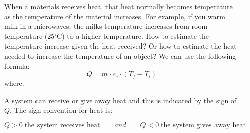 \documentclass[main.tex]{subfiles}
\begin{document}
\begin{description}
\item[] 
When a materials receives heat, that heat normally becomes temperature as the temperature of the material increases. For example, if you warm milk in a microwaves, the milk\textquotesingle s temperature increases from room temperature (25$^{\circ}$C) to a higher temperature. How to estimate the temperature increase given the heat received? Or how to estimate the heat needed to increase the temperature of an object? We can use the following formula:
\begin{equation}
\boxed{    Q=m\cdot c_e\cdot  (T_{f}-T_{i})   } 
\label{formula2:3}
\end{equation}
where:
A system can receive or give away heat and this is indicated by the sign of $Q$. The sign convention for heat is:
\begin{solutionbox}
\[ Q > 0 \; \text{the system receives heat}\qquad and \qquad Q < 0 \; \text{the system gives away heat}\]
\end{solutionbox}





\end{description}
\end{document}

